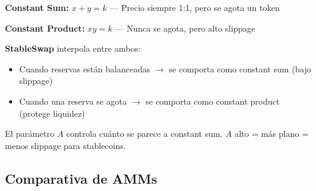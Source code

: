 \documentclass[11pt,a4paper,twoside]{book}
\begin{document}
\begin{intuicion}
\textbf{Constant Sum:} $x + y = k$ --- Precio siempre 1:1, pero se agota un token

\textbf{Constant Product:} $xy = k$ --- Nunca se agota, pero alto slippage

\textbf{StableSwap} interpola entre ambos:
\begin{itemize}
    \item Cuando reservas est\'an balanceadas $\to$ se comporta como constant sum (bajo slippage)
    \item Cuando una reserva se agota $\to$ se comporta como constant product (protege liquidez)
\end{itemize}

El par\'ametro $A$ controla cu\'anto se parece a constant sum. $A$ alto = m\'as plano = menos slippage para stablecoins.
\end{intuicion}

\begin{center}
\end{center}

\subsection{Comparativa de AMMs}
\end{document}
